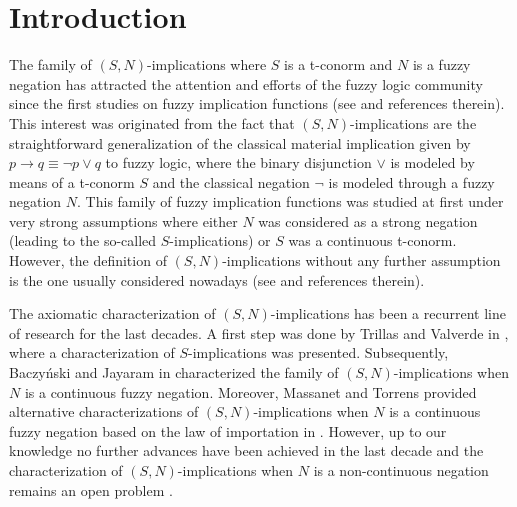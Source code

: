 
\graphicspath{{./_figures/05_snimplications/}}

\section{Introduction}\label{section:introduction}
The family of $(S,N)$-implications where $S$ is a t-conorm and $N$ is a fuzzy negation has attracted the attention and efforts of the fuzzy logic community since the first studies on fuzzy implication functions (see \cite{Dubois1999,Fodor1994,Klir1995,Trillas1985} and references therein). This interest was originated from the fact that $(S,N)$-implications are the straightforward generalization of the classical material implication given by $p\rightarrow q \equiv \neg p \vee q$ to fuzzy logic, where the binary disjunction $\vee$ is modeled by means of a t-conorm $S$ and the classical negation $\neg$ is modeled through a fuzzy negation $N$. This family of fuzzy implication functions was studied at first under very strong assumptions where either $N$ was considered as a strong negation (leading to the so-called $S$-implications) or $S$ was a continuous t-conorm. However, the definition of $(S,N)$-implications without any further assumption is the one usually considered nowadays (see \cite{Baczynski2008,Baczynski2015,Mas2007} and references therein).

The axiomatic characterization of $(S,N)$-implications has been a recurrent line of research for the last decades. A first step was done by Trillas and Valverde in \cite{Trillas1985}, where a characterization of $S$-implications was presented. Subsequently, Baczy\'nski and Jayaram in \cite{Baczynski2007} characterized the family of $(S,N)$-implications when $N$ is a continuous fuzzy negation. Moreover, Massanet and Torrens provided alternative characterizations of $(S,N)$-implications when $N$ is a continuous fuzzy negation based on the law of importation in \cite{Massanet2011B}. However, up to our knowledge no further advances have been achieved in the last decade and the characterization of $(S,N)$-implications when $N$ is a non-continuous negation remains an open problem \cite{Baczynski2008,Baczynski2015}.

